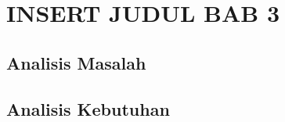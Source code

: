 

\chapter{INSERT JUDUL BAB 3}

\section{Analisis Masalah}

\section{Analisis Kebutuhan} \label{sec:analisis-kebutuhan}
